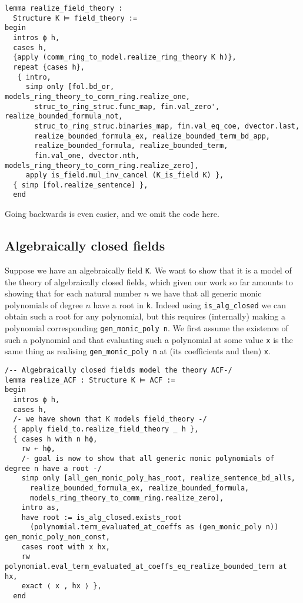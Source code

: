 \begin{lstlisting}
lemma realize_field_theory :
  Structure K ⊨ field_theory :=
begin
  intros ϕ h,
  cases h,
  {apply (comm_ring_to_model.realize_ring_theory K h)},
  repeat {cases h},
   { intro,
     simp only [fol.bd_or, models_ring_theory_to_comm_ring.realize_one,
       struc_to_ring_struc.func_map, fin.val_zero', realize_bounded_formula_not,
       struc_to_ring_struc.binaries_map, fin.val_eq_coe, dvector.last,
       realize_bounded_formula_ex, realize_bounded_term_bd_app,
       realize_bounded_formula, realize_bounded_term,
       fin.val_one, dvector.nth, models_ring_theory_to_comm_ring.realize_zero],
     apply is_field.mul_inv_cancel (K_is_field K) },
  { simp [fol.realize_sentence] },
  end\end{lstlisting}

Going backwards is even easier, and we omit the code here.

\subsection{Algebraically closed fields}

Suppose we have an algebraically field \texttt{K}.
We want to show that it is a model of the theory of algebraically closed fields,
which given our work so far amounts to showing that for each natural number $n$
we have that all generic monic polynomials of degree $n$ have a root in \texttt{k}.
Indeed using \texttt{is\_alg\_closed} we can obtain such a root for any polynomial,
but this requires (internally) making a polynomial corresponding \texttt{gen\_monic\_poly n}.
We first assume the existence of such a polynomial and that evaluating such a polynomial
at some value \texttt{x} is the same thing as realising \texttt{gen\_monic\_poly n}
at (its coefficients and then) \texttt{x}.

\begin{lstlisting}
/-- Algebraically closed fields model the theory ACF-/
lemma realize_ACF : Structure K ⊨ ACF :=
begin
  intros ϕ h,
  cases h,
  /- we have shown that K models field_theory -/
  { apply field_to.realize_field_theory _ h },
  { cases h with n hϕ,
    rw ← hϕ,
    /- goal is now to show that all generic monic polynomials of degree n have a root -/
    simp only [all_gen_monic_poly_has_root, realize_sentence_bd_alls,
      realize_bounded_formula_ex, realize_bounded_formula,
      models_ring_theory_to_comm_ring.realize_zero],
    intro as,
    have root := is_alg_closed.exists_root
      (polynomial.term_evaluated_at_coeffs as (gen_monic_poly n)) gen_monic_poly_non_const,
    cases root with x hx,
    rw polynomial.eval_term_evaluated_at_coeffs_eq_realize_bounded_term at hx,
    exact ⟨ x , hx ⟩ },
  end\end{lstlisting}

